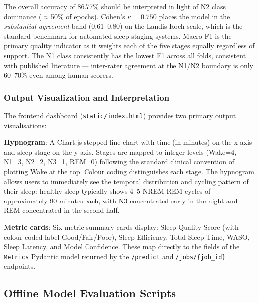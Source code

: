 \documentclass[10pt]{article}
\begin{document}
\begin{remark}
The overall accuracy of 86.77\% should be interpreted in light of N2 class dominance ($\approx$50\% of epochs). Cohen's $\kappa = 0.750$ places the model in the \textit{substantial agreement} band (0.61--0.80) on the Landis-Koch scale, which is the standard benchmark for automated sleep staging systems. Macro-F1 is the primary quality indicator as it weights each of the five stages equally regardless of support. The N1 class consistently has the lowest F1 across all folds, consistent with published literature — inter-rater agreement at the N1/N2 boundary is only 60--70\% even among human scorers.
\end{remark}

\subsubsection{Output Visualization and Interpretation}
\label{sec:outputVisualization}

The frontend dashboard (\texttt{static/index.html}) provides two primary output visualisations:

\textbf{Hypnogram}: A Chart.js stepped line chart with time (in minutes) on the x-axis and sleep stage on the y-axis. Stages are mapped to integer levels (Wake=4, N1=3, N2=2, N3=1, REM=0) following the standard clinical convention of plotting Wake at the top. Colour coding distinguishes each stage. The hypnogram allows users to immediately see the temporal distribution and cycling pattern of their sleep: healthy sleep typically shows 4--5 NREM-REM cycles of approximately 90 minutes each, with N3 concentrated early in the night and REM concentrated in the second half.

\textbf{Metric cards}: Six metric summary cards display: Sleep Quality Score (with colour-coded label Good/Fair/Poor), Sleep Efficiency, Total Sleep Time, WASO, Sleep Latency, and Model Confidence. These map directly to the fields of the \texttt{Metrics} Pydantic model returned by the \texttt{/predict} and \texttt{/jobs/\{job\_id\}} endpoints.


\subsection{Offline Model Evaluation Scripts}
\label{sec:evalScripts}
\end{document}
